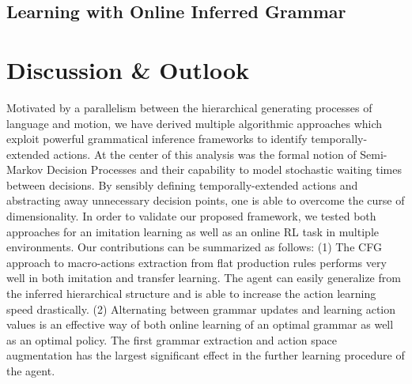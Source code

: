 \documentclass[colorinlistoftodos]{article}
\theoremstyle{definition}
\newcommand{\rob}[1]{\todo[color=red!40]{Rob: #1}}
\begin{document}
\subsection{Learning with Online Inferred Grammar}


\rob{Add Grammar DQN experiments.}

\newpage
\section{Discussion \& Outlook}

Motivated by a parallelism between the hierarchical generating processes of language and motion, we have derived multiple algorithmic approaches which exploit powerful grammatical inference frameworks to identify temporally-extended actions. At the center of this analysis was the formal notion of Semi-Markov Decision Processes and their capability to model stochastic waiting times between decisions. By sensibly defining temporally-extended actions and abstracting away unnecessary decision points, one is able to overcome the curse of dimensionality. 
In order to validate our proposed framework, we tested both approaches for an imitation learning as well as an online RL task in multiple environments. Our contributions can be summarized as follows:
%
(1) The CFG approach to macro-actions extraction from flat production rules performs very well in both imitation and transfer learning. The agent can easily generalize from the inferred hierarchical structure and is able to increase the action learning speed drastically.
%
(2) Alternating between grammar updates and learning action values is an effective way of both online learning of an optimal grammar as well as an optimal policy. The first grammar extraction and action space augmentation has the largest significant effect in the further learning procedure of the agent. 
\end{document}
